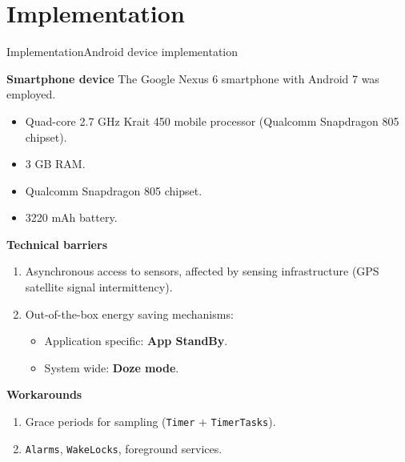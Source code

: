 \section{Implementation}
\begin{frame}{Implementation}{Android device implementation}
\small

\begin{block}{\small \textbf{Smartphone device}}
The Google Nexus 6 smartphone with Android 7 was employed.
\begin{itemize}
  \item Quad-core 2.7 GHz Krait 450 mobile processor (Qualcomm Snapdragon 805 chipset).
  \item 3 GB RAM.
  \item Qualcomm Snapdragon 805 chipset.
  \item 3220 mAh battery.
\end{itemize}
\end{block}

\begin{alertblock}{\small \textbf{Technical barriers}}
\begin{enumerate}
  \item Asynchronous access to sensors, affected by sensing infrastructure (GPS satellite signal intermittency).
  \item Out-of-the-box energy saving mechanisms:
  \begin{itemize}
    \item Application specific: \textbf{App StandBy}.
    \item System wide: \textbf{Doze mode}.
  \end{itemize}
\end{enumerate}
\end{alertblock}

\begin{exampleblock}{\small \textbf{Workarounds}}
\begin{enumerate}
  \item Grace periods for sampling (\texttt{Timer} + \texttt{TimerTasks}).
  \item \texttt{Alarms}, \texttt{WakeLocks}, foreground services.
\end{enumerate}
\end{exampleblock}
\end{frame}
